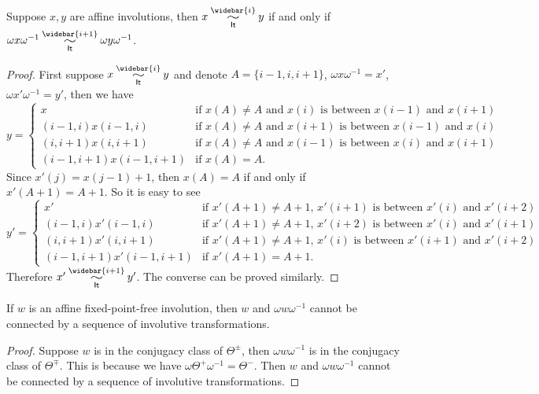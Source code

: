 \documentclass[11pt]{article}
\begin{document}
\begin{proposition}\label{omega-it-prop}
Suppose $x,y$ are affine involutions, then $x\simRBS{\widebar{i}}y$ if and only if $\omega x\omega^{-1} \simRBS{\widebar{i+1}}\omega y\omega^{-1}$.
\end{proposition}
\begin{proof}
First suppose $x\simRBS{\widebar{i}}y$ and denote $A=\{i-1,i,i+1\}$, $\omega x\omega^{-1}=x'$, $\omega x'\omega^{-1}=y'$, then we have 
\[
y = \begin{cases} x &\text{if $x(A) \neq A$ and $x(i)$ is between $x(i-1)$ and $x(i+1)$}
\\
 (i-1,i)x (i-1,i) &\text{if $x(A) \neq A$ and $x(i+1)$ is between $x(i-1)$ and $x(i)$}
\\
(i,i+1)x (i,i+1) &\text{if $x(A) \neq A$ and $x(i-1)$ is between $x(i)$ and $x(i+1)$ }
\\
 (i-1,i+1)x(i-1,i+1) &\text{if $x(A) = A$}.
\end{cases}
\]
Since $x'(j)=x(j-1)+1$, then $x(A)=A$ if and only if $x'(A+1)=A+1$. So it is easy to see
\[
y'= \begin{cases} x'&\text{if $x'(A+1) \neq A+1$, $x'(i+1)$ is between $x'(i)$ and $x'(i+2)$}
\\
 (i-1,i)x'(i-1,i) &\text{if $x'(A+1) \neq A+1$, $x'(i+2)$ is between $x'(i)$ and $x'(i+1)$}
\\
(i,i+1)x'(i,i+1) &\text{if $x'(A+1) \neq A+1$, $x'(i)$ is between $x'(i+1)$ and $x'(i+2)$ }
\\
 (i-1,i+1)x'(i-1,i+1) &\text{if $x'(A+1) = A+1$}.
\end{cases}
\]
Therefore $x' \simRBS{\widebar{i+1}}y'$. The converse can be proved similarly.
\end{proof}

\begin{proposition}\label{omega-prop}
If $w$ is an affine fixed-point-free involution, then $w$ and $\omega w\omega^{-1}$ cannot be connected by a sequence of involutive transformations.
\end{proposition}
\begin{proof}
Suppose $w$ is in the conjugacy class of $\Theta^\pm$, then $\omega w\omega^{-1}$ is in the conjugacy class of $\Theta^\mp$. This is because we have $\omega\Theta^+\omega^{-1}=\Theta^-$. Then $w$ and $\omega w\omega^{-1}$ cannot be connected by a sequence of involutive transformations.
\end{proof}
\end{document}
